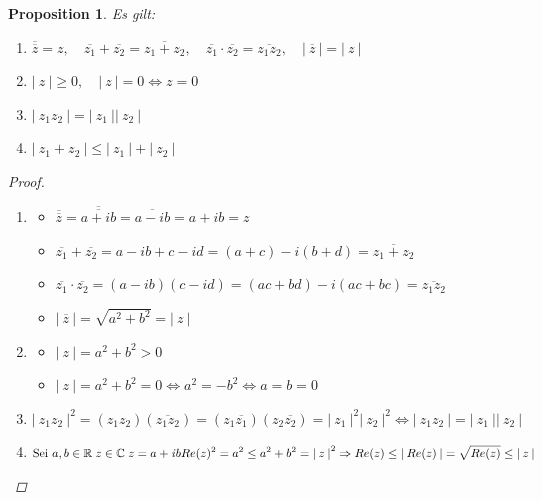 \documentclass[a4paper,titlepage,oneside]{article}
\def\C{\ensuremath{\mathbb{C}} }
\def\R{\ensuremath{\mathbb{R}} }
\def\im{\ensuremath{\mathit{i}} }
\def\sp{\hspace{0,1cm}}
\newcommand{\abs}[1]{\ensuremath{\left|\:#1\:\right|}}
\theoremstyle{thmstyle}
\newtheorem{prop}[satz]{Proposition}
\theoremstyle{subthmstyle}
\begin{document}
\begin{prop}
Es gilt:
\begin{enumerate}[label=(\roman*)]
\item $\displaystyle \overline{\overline{z}} = z, \quad \overline{z_1} + \overline{z_2} = \overline{z_1 + z_2}, \quad \overline{z_1} \cdot \overline{z_2} = \overline{z_1  z_2}, \quad \abs{\overline{z}} = \abs{z} $
\item $\displaystyle \abs{z} \ge 0, \quad \abs{z} = 0 \Leftrightarrow z = 0$
\item $\displaystyle\abs{z_1 z_2} = \abs{z_1} \abs{z_2}$
\item $\displaystyle \abs{z_1 + z_2} \le \abs{z_1} + \abs{z_2}$
\end{enumerate}
\begin{proof} \sp
\begin{enumerate}[label=(\roman*)]
\item
\begin{itemize}
\item $\displaystyle\overline{\overline{z}} = \overline{\overline{a + \im b}} = \overline{a - \im b} = a + \im b = z $
\item $\displaystyle\overline{z_1} + \overline{z_2} = a - \im b + c - \im d = (a + c) - \im (b + d) = \overline{z_1 + z_2} $
\item $\displaystyle\overline{z_1} \cdot \overline{z_2} = (a - \im b) (c - \im d) = (ac + bd) - \im (ac + bc) = \overline{z_1  z_2} $
\item $\displaystyle \abs{\overline{z}} = \sqrt{a^2 + b^2} = \abs{z}$
\end{itemize}
\item
\begin{itemize}
\item \(\abs{z} = a^2 + b^2 > 0 \)
\item \(\abs{z} = a^2 + b^2 = 0 \Leftrightarrow a^2 = - b^2 \Leftrightarrow a = b = 0 \)
\end{itemize}
\item $ \displaystyle \abs{z_1 z_2}^2 = (z_1 z_2)(\overline{z_1 z_2}) = (z_1\overline{z_1})(z_2\overline{z_2}) = \abs{z_1}^2\abs{z_2}^2 \Leftrightarrow \abs{z_1 z_2} = \abs{z_1}\abs{z_2} $
\item  \begin{math} \displaystyle 
\text{Sei }a, b \in \R \sp z \in \C \sp z = a + \im b \\
\begin{aligned}[t]
Re(z)^2 = a^2 \le a^2 + b^2 = \abs{z}^2 &\Rightarrow Re(z) \le \abs{Re(z)} = \sqrt{Re(z)} \le \abs{z} \\

\end{aligned}
\end{math}
\end{enumerate}
\end{proof}
\end{prop}
\end{document}
